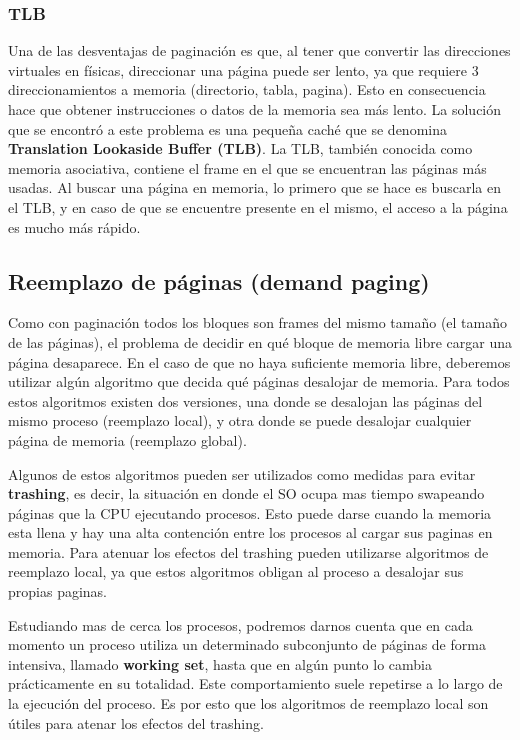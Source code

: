 \documentclass{article}
\begin{document}
\subsubsection{TLB}
Una de las desventajas de paginaci\'on es que, al tener que convertir las direcciones virtuales en f\'isicas, direccionar una p\'agina puede ser lento, ya que requiere 3 direccionamientos a memoria (directorio, tabla, pagina). Esto en consecuencia hace que obtener instrucciones o datos de la memoria sea m\'as lento. La soluci\'on que se encontr\'o a este problema es una peque\~na cach\'e que se denomina \textbf{Translation Lookaside Buffer (TLB)}. La TLB, tambi\'en conocida como memoria asociativa, contiene el frame en el que se encuentran las p\'aginas m\'as usadas. Al buscar una p\'agina en memoria, lo primero que se hace es buscarla en el TLB, y en caso de que se encuentre presente en el mismo, el acceso a la p\'agina es mucho m\'as r\'apido.

\subsection{Reemplazo de p\'aginas (demand paging)}

Como con paginación todos los bloques son frames del mismo tamaño (el tamaño de las páginas), el problema de decidir en qué bloque de memoria libre cargar una página desaparece. En el caso de que no haya suficiente memoria libre, deberemos utilizar algún algoritmo que decida qué páginas desalojar de memoria. Para todos estos algoritmos existen dos versiones, una donde se desalojan las p\'aginas del mismo proceso (reemplazo local), y otra donde se puede desalojar cualquier p\'agina de memoria (reemplazo global).

Algunos de estos algoritmos pueden ser utilizados como medidas para evitar \textbf{trashing}, es decir, la situación en donde el SO ocupa mas tiempo swapeando páginas que la CPU ejecutando procesos. Esto puede darse cuando la memoria esta llena y hay una alta contención entre los procesos al cargar sus paginas en memoria. Para atenuar los efectos del trashing pueden utilizarse algoritmos de reemplazo local, ya que estos algoritmos obligan al proceso a desalojar sus propias paginas. 

Estudiando mas de cerca los procesos, podremos darnos cuenta que en cada momento un proceso utiliza un determinado subconjunto de páginas de forma intensiva, llamado \textbf{working set}, hasta que en algún punto lo cambia prácticamente en su totalidad. Este comportamiento suele repetirse a lo largo de la ejecución del proceso. Es por esto que los algoritmos de reemplazo local son útiles para atenar los efectos del trashing.
\end{document}

